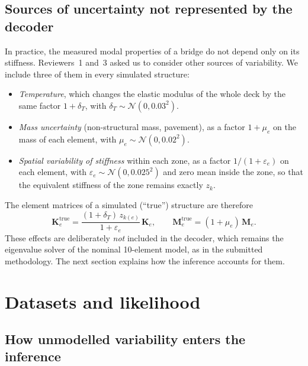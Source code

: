 \documentclass[11pt]{article}
\begin{document}
\subsection{Sources of uncertainty not represented by the decoder}

In practice, the measured modal properties of a bridge do not depend only on its stiffness. Reviewers~1 and~3 asked us
to consider other sources of variability. We include three of them in every simulated structure:
\begin{itemize}[leftmargin=*]
\item \emph{Temperature}, which changes the elastic modulus of the whole deck by the same factor $1+\delta_T$, with
$\delta_T\sim\mathcal{N}(0,0.03^2)$.
\item \emph{Mass uncertainty} (non-structural mass, pavement), as a factor $1+\mu_e$ on the mass of each element, with
$\mu_e\sim\mathcal{N}(0,0.02^2)$.
\item \emph{Spatial variability of stiffness} within each zone, as a factor $1/(1+\varepsilon_e)$ on each element,
with $\varepsilon_e\sim\mathcal{N}(0,0.025^2)$ and zero mean inside the zone, so that the equivalent stiffness of the
zone remains exactly $z_k$.
\end{itemize}
The element matrices of a simulated (``true'') structure are therefore
\begin{equation}
\mathbf{K}_e^{\mathrm{true}} = \frac{(1+\delta_T)\,z_{k(e)}}{1+\varepsilon_e}\,\mathbf{K}_e,\qquad
\mathbf{M}_e^{\mathrm{true}} = (1+\mu_e)\,\mathbf{M}_e .
\label{eq:true}
\end{equation}
These effects are deliberately \emph{not} included in the decoder, which remains the eigenvalue solver of the nominal
10-element model, as in the submitted methodology. The next section explains how the inference accounts for them.

\section{Datasets and likelihood}

\subsection{How unmodelled variability enters the inference}
\end{document}
